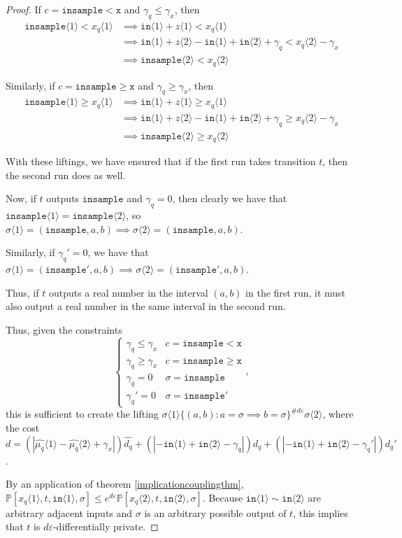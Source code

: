 \documentclass[12pt]{article}
\newcommand{\PP}{\mathbb{P}}
\newcommand{\gguard}[1][x]{\texttt{insample}\geq #1}
\newcommand{\lguard}[1][x]{\texttt{insample} < #1}
\newcommand{\brangle}[1]{\langle #1 \rangle}
\theoremstyle{definition}
\begin{document}
\begin{proof}
If $c=\lguard[\texttt{x}]$ and $\gamma_q\leq \gamma_x$, then \begin{align*}
    \texttt{insample}\brangle{1}<x_q\brangle{1}&\implies \texttt{in}\brangle{1}+z\brangle{1}<x_q\brangle{1}\\
    &\implies \texttt{in}\brangle{1}+z\brangle{2}-\texttt{in}\brangle{1}+\texttt{in}\brangle{2}+\gamma_q<x_q\brangle{2}-\gamma_x\\
    &\implies \texttt{insample}\brangle{2}<x_q\brangle{2}
\end{align*}

Similarly, if $c=\gguard[\texttt{x}]$ and $\gamma_q\geq \gamma_x$, then \begin{align*}
    \texttt{insample}\brangle{1}\geq x_q\brangle{1}&\implies \texttt{in}\brangle{1}+z\brangle{1}\geq x_q\brangle{1}\\
    &\implies \texttt{in}\brangle{1}+z\brangle{2}-\texttt{in}\brangle{1}+\texttt{in}\brangle{2}+\gamma_q\geq x_q\brangle{2}-\gamma_x\\
    &\implies \texttt{insample}\brangle{2}\geq x_q\brangle{2}
\end{align*}

With these liftings, we have ensured that if the first run takes transition $t$, then the second run does as well. 

Now, if $t$ outputs $\texttt{insample}$ and $\gamma_q=0$, then clearly we have that $\texttt{insample}\brangle{1}=\texttt{insample}\brangle{2}$, so $\sigma\brangle{1} = (\texttt{insample}, a, b)\implies \sigma\brangle{2}=(\texttt{insample}, a, b)$.

Similarly, if $\gamma_q'=0$, we have that $\sigma\brangle{1} = (\texttt{insample}', a, b)\implies \sigma\brangle{2}=(\texttt{insample}', a, b)$. 

Thus, if $t$ outputs a real number in the interval $(a, b)$ in the first run, it must also output a real number in the same interval in the second run. 

Thus, given the constraints \[
  \begin{cases}
    \gamma_q\leq\gamma_x & c = \lguard[\texttt{x}]\\
    \gamma_q\geq\gamma_x & c = \gguard[\texttt{x}]\\
    \gamma_q=0 & \sigma = \texttt{insample}\\
    \gamma_q'=0 & \sigma = \texttt{insample}'
  \end{cases},
\]
this is sufficient to create the lifting $\sigma\brangle{1}\{(a, b): a=\sigma\implies b=\sigma\}^{\#d\varepsilon}\sigma\brangle{2}$, where the cost $d = (|\hat{\mu_q}\brangle{1}-\hat{\mu_q}\brangle{2}+\gamma_x|)\hat{d_q}+(|-\texttt{in}\brangle{1}+\texttt{in}\brangle{2}-\gamma_q|)d_q+(|-\texttt{in}\brangle{1}+\texttt{in}\brangle{2}-\gamma_q'|)d_q'$. 

By an application of theorem \ref{implicationcouplingthm}, $\PP[x_q\brangle{1}, t, \texttt{in}\brangle{1}, \sigma]\leq e^{d\varepsilon}\PP[x_q\brangle{2}, t, \texttt{in}\brangle{2}, \sigma]$. Because $\texttt{in}\brangle{1}\sim\texttt{in}\brangle{2}$ are arbitrary adjacent inputs and $\sigma$ is an arbitrary possible output of $t$, this implies that $t$ is $d\varepsilon$-differentially private. 
\end{proof}
\end{document}
